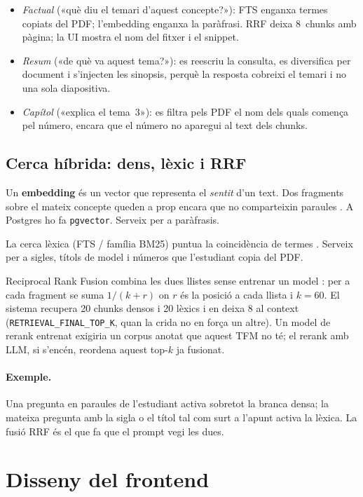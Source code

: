 \begin{itemize}
  \item \emph{Factual} («què diu el temari d'aquest concepte?»): FTS enganxa termes copiats del PDF; l'embedding enganxa la paràfrasi. RRF deixa 8~chunks amb pàgina; la UI mostra el nom del fitxer i el snippet.
  \item \emph{Resum} («de què va aquest tema?»): es reescriu la consulta, es diversifica per document i s'injecten les sinopsis, perquè la resposta cobreixi el temari i no una sola diapositiva.
  \item \emph{Capítol} («explica el tema~3»): es filtra pels PDF el nom dels quals comença pel número, encara que el número no aparegui al text dels chunks.
\end{itemize}

\subsection{Cerca híbrida: dens, lèxic i RRF}
\label{sec:rag-hibrid}

Un \textbf{embedding} és un vector que representa el \emph{sentit} d'un text. Dos fragments sobre el mateix concepte queden a prop encara que no comparteixin paraules \parencite{karpukhin2020dpr}. A Postgres ho fa \texttt{pgvector}. Serveix per a paràfrasis.

La cerca lèxica (FTS / família BM25) puntua la coincidència de termes \parencite{robertson2009probabilistic}. Serveix per a sigles, títols de model i números que l'estudiant copia del PDF.

Reciprocal Rank Fusion combina les dues llistes sense entrenar un model \parencite{cormack2009rrf}: per a cada fragment se suma $1/(k + r)$ on $r$ és la posició a cada llista i $k=60$. El sistema recupera 20 chunks densos i 20 lèxics i en deixa 8 al context (\texttt{RETRIEVAL\_FINAL\_TOP\_K}, quan la crida no en força un altre). Un model de rerank entrenat exigiria un corpus anotat que aquest TFM no té; el rerank amb LLM, si s'encén, reordena aquest top-$k$ ja fusionat.

\paragraph{Exemple.}
Una pregunta en paraules de l'estudiant activa sobretot la branca densa; la mateixa pregunta amb la sigla o el títol tal com surt a l'apunt activa la lèxica. La fusió RRF és el que fa que el prompt vegi les dues.

\section{Disseny del frontend}

